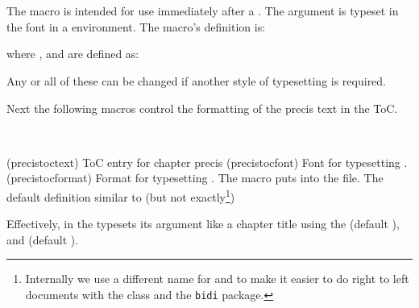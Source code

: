 \begin{syntax}
\cmd{\precisfont} \\
\cmd{\prechapterprecis} \cmd{\postchapterprecis} \\
\end{syntax}
The \cmd{\chapterprecishere} macro is intended for use immediately after 
a \cmd{\chapter}. The  argument is typeset in
the \cmd{\precisfont} font in a  environment. The macro's 
definition is:
\begin{lcode}
\newcommand{\chapterprecishere}[1]{%
  \prechapterprecis #1\postchapterprecis}
\end{lcode}
where \cmd{\prechapterprecis}, \cmd{\postchapterprecis} and \cmd{\precisfont}
are defined as:
\begin{lcode}
\newcommand{\prechapterprecis}{%
  \vspace*{\prechapterprecisshift}%
  \begin{quote}\precisfont}
\newcommand{\postchapterprecis}{\end{quote}}
\newcommand*{\precisfont}{\normalfont\itshape}
\end{lcode}
Any or all of these can be changed if another style of typesetting is required.

Next the following macros control the formatting of the precis text in
the ToC.
\begin{syntax}
\cmd{\precistoctext} \cmd{\precistocfont} \cmd{\precistocformat} \\
\end{syntax}
\glossary(precistoctext)%
  {}%
  {ToC entry for chapter precis }
\glossary(precistocfont)%
  {}%
  {Font for typesetting .}
\glossary(precistocformat)%
  {}%
  {Format for typesetting .}
The \cmd{\chapterprecistoc} macro puts \cmd{\precistoctext} into 
the  file. The default definition similar to (but not
exactly\footnote{Internally we use a different name for 
  and  to make it easier to do right to left documents
with the class and the \texttt{bidi} package.})
\begin{lcode}
\DeclareRobustCommand{\precistoctext}[1]{%
  {\nopagebreak\leftskip \cftchapterindent\relax
    \advance\leftskip \cftchapternumwidth\relax
    \rightskip \@tocrmarg\relax
    \precistocformat\precistocfont #1\par}}
\end{lcode}
Effectively, in the \toc{} \cmd{\precistoctext} typesets its argument like 
a chapter title using the \cmd{\precistocfont} (default
\cmd{\itshape}), and \cmd{\precistocformat} (default \cmd{\noindent}).

